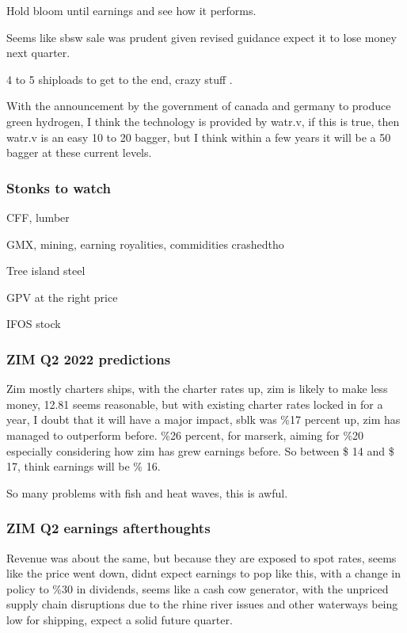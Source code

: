 Hold bloom until earnings and see how it performs.

Seems like sbsw sale was prudent given revised guidance expect it to lose money next quarter.


4 to 5 shiploads to get to the end, crazy stuff \cite{youtube_2022}.

With the announcement by the government of canada and germany to produce green hydrogen, I think the technology is provided by watr.v, if this is true, then watr.v is an easy 10 to 20 bagger, but I think within a few years it will be a 50 bagger at these current levels.

\subsubsection{Stonks to watch}

CFF, lumber

GMX, mining, earning royalities, commidities crashedtho

Tree island steel

GPV at the right price

IFOS stock
\subsubsection{ZIM Q2 2022 predictions}

Zim mostly charters ships, with the charter rates up, zim is likely to make less money, 12.81 seems reasonable, but with existing charter rates locked in for a year, I doubt that it will have a major impact, sblk was \%17 percent up, zim has managed to outperform before. \%26 percent, for marserk, aiming for \%20 especially considering how zim has grew earnings before. So between \$ 14 and \$ 17, think earnings will be \% 16.


So many problems with fish and heat waves, this is awful.

\subsubsection{ZIM Q2 earnings afterthoughts} 

Revenue was about the same, but because they are exposed to spot rates, seems like the price went down, didnt expect earnings to pop like this, with a change in policy to \%30 in dividends, seems like a cash cow generator, with the unpriced supply chain disruptions due to the rhine river issues and other waterways being low for shipping, expect a solid future quarter. 

